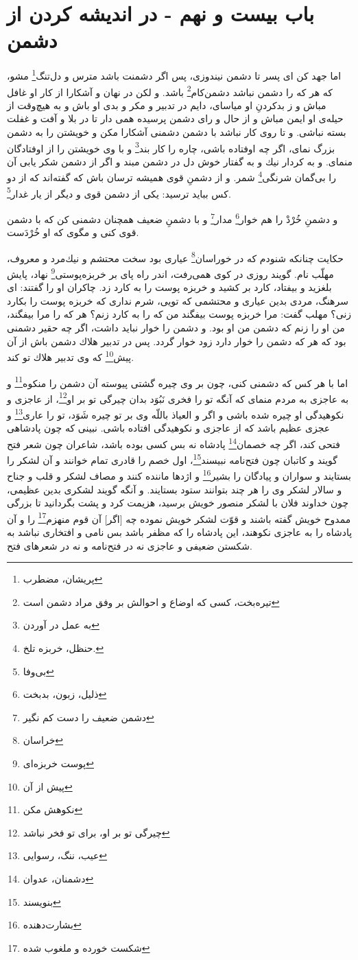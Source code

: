 \section*{باب بيست و نهم - 
در انديشه كردن از دشمن}

اما جهد كن اى پسر تا دشمن نيندوزى، پس اگر دشمنت باشد مترس و دل‌تنگ\footnote{پریشان، مضطرب} مشو، كه هر كه را دشمن نباشد دشمن‌كام\footnote{تیره‌بخت، کسی که اوضاع و احوالش بر وفق مراد دشمن است} باشد. و لكن در نهان و آشكارا از كار او غافل مباش و ز بدكردنِ او مياساى، دايم در تدبير و مكر و بدى او باش و به هيچ‌وقت از حيله‌ی او ايمن مباش و از حال و راى دشمن پرسيده همى دار تا در بلا و آفت و غفلت بسته نباشى. و تا روى كار نباشد با دشمن دشمنى آشكارا مكن و خويشتن را به دشمن بزرگ نماى، اگر چه اوفتاده باشى، چاره را كار بند\footnote{به عمل در آوردن} و با وى خويشتن را از اوفتادگان منماى. و به كردار نيك و به گفتار خوش دل در دشمن مبند و اگر از دشمن شكر يابى آن را بى‌گمان شرنگى\footnote{حنظل، خربزه تلخ.} شمر. و از دشمنِ قوى هميشه ترسان باش كه گفته‌اند كه از دو كس ببايد ترسيد: يكى از دشمن قوى و ديگر از يار غدار\footnote{بی‌وفا}.

و دشمنِ خُرْدْ را هم‌ خوار\footnote{ذلیل، زبون، بدبخت} مدار\footnote{دشمن ضعیف را دست کم نگیر} و با دشمنِ ضعيف همچنان دشمنى كن كه با دشمن قوى كنى و مگوى كه او خُرْدَست.

حكايت چنانكه شنودم كه در خوراسان\footnote{خراسان} عيارى بود سخت محتشم و نيك‌مرد و معروف، مهلّب نام. گويند روزى در كوى همى‌رفت، اندر راه پاى بر خربزه‌پوستى\footnote{پوست خربزه‌ای} نهاد، پايش بلغزيد و بيفتاد، كارد بر كشيد و خربزه پوست را به كارد زد. چاكران او را گفتند: اى سرهنگ، مردى بدين عيارى و محتشمى كه تويى، شرم ندارى كه خربزه پوست را بكارد زنى‌؟ مهلب گفت: مرا خربزه پوست بيفگند من كه را به كارد زنم‌؟ هر كه را مرا بيفگند، من او را زنم كه دشمن من او بود. و دشمن را خوار نبايد داشت، اگر چه حقير دشمنى بود كه هر كه دشمن را خوار دارد زود خوار گردد. پس در تدبير هلاك دشمن باش از آن پيش\footnote{پیش از آن} كه وى تدبير هلاك تو كند.

اما با هر كس كه دشمنى كنى، چون بر وى چيره گشتى پيوسته آن دشمن را منكوه\footnote{نکوهش مکن} و به عاجزى به مردم منماى كه آنگه تو را فخرى نَبُوَد بدان چيرگى تو بر او\footnote{چیرگی تو بر او، برای تو فخر نباشد}، از عاجزى و نكوهيدگى او چيره شده باشى و اگر و العياذ باللّه وى بر تو چيره شَوَد، تو را عارى\footnote{عیب، ننگ، رسوایی} و عجزى عظيم باشد كه از عاجزى و نكوهيدگى افتاده باشى. نبينى كه چون پادشاهى فتحى كند، اگر چه خصمان\footnote{دشمنان، عدوان} پادشاه نه بس كسى بوده باشد، شاعران چون شعر فتح گويند و كاتبان چون فتح‌نامه نبيسند\footnote{بنویسند}، اول خصم را قادرى تمام خوانند و آن لشكر را بستايند و سواران و پيادگان را بشير\footnote{بشارت‌دهنده} و اژدها ماننده كنند و مصاف لشكر و قلب و جناح و سالار لشكر وى را هر چند بتوانند ستود بستايند. و آنگه گويند لشكرى بدين عظيمى، چون خداوند فلان با لشكر منصور خويش برسيد، هزيمت كرد و پشت بگردانيد تا بزرگى ممدوح خويش گفته باشند و قوّت لشكر خويش نموده چه [اگر] آن قوم منهزم\footnote{شکست خورده و ملغوب شده} را و آن پادشاه را به عاجزى نكوهند، اين پادشاه را كه مظفر باشد بس نامى و افتخارى نباشد به شكستن ضعيفى و عاجزى نه در فتح‌نامه و نه در شعرهاى فتح.

